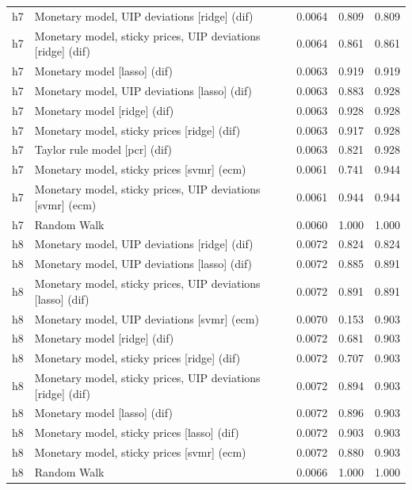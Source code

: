 \begin{ThreePartTable}
\begin{longtable}[t]{cp{5.5cm}ccc}
\addlinespace
h7 & \raggedright Monetary model, UIP deviations [ridge] (dif) & 0.0064 & 0.809 & 0.809\\
h7 & \raggedright Monetary model, sticky prices, UIP deviations [ridge] (dif) & 0.0064 & 0.861 & 0.861\\
h7 & \raggedright Monetary model [lasso] (dif) & 0.0063 & 0.919 & 0.919\\
h7 & \raggedright Monetary model, UIP deviations [lasso] (dif) & 0.0063 & 0.883 & 0.928\\
h7 & \raggedright Monetary model [ridge] (dif) & 0.0063 & 0.928 & 0.928\\
h7 & \raggedright Monetary model, sticky prices [ridge] (dif) & 0.0063 & 0.917 & 0.928\\
h7 & \raggedright Taylor rule model [pcr] (dif) & 0.0063 & 0.821 & 0.928\\
h7 & \raggedright Monetary model, sticky prices [svmr] (ecm) & 0.0061 & 0.741 & 0.944\\
h7 & \raggedright Monetary model, sticky prices, UIP deviations [svmr] (ecm) & 0.0061 & 0.944 & 0.944\\
h7 & \raggedright Random Walk & 0.0060 & 1.000 & 1.000\\
\addlinespace
h8 & \raggedright Monetary model, UIP deviations [ridge] (dif) & 0.0072 & 0.824 & 0.824\\
h8 & \raggedright Monetary model, UIP deviations [lasso] (dif) & 0.0072 & 0.885 & 0.891\\
h8 & \raggedright Monetary model, sticky prices, UIP deviations [lasso] (dif) & 0.0072 & 0.891 & 0.891\\
h8 & \raggedright Monetary model, UIP deviations [svmr] (ecm) & 0.0070 & 0.153 & 0.903\\
h8 & \raggedright Monetary model [ridge] (dif) & 0.0072 & 0.681 & 0.903\\
h8 & \raggedright Monetary model, sticky prices [ridge] (dif) & 0.0072 & 0.707 & 0.903\\
h8 & \raggedright Monetary model, sticky prices, UIP deviations [ridge] (dif) & 0.0072 & 0.894 & 0.903\\
h8 & \raggedright Monetary model [lasso] (dif) & 0.0072 & 0.896 & 0.903\\
h8 & \raggedright Monetary model, sticky prices [lasso] (dif) & 0.0072 & 0.903 & 0.903\\
h8 & \raggedright Monetary model, sticky prices [svmr] (ecm) & 0.0072 & 0.880 & 0.903\\
h8 & \raggedright Random Walk & 0.0066 & 1.000 & 1.000\\

\end{longtable}
\end{ThreePartTable}
